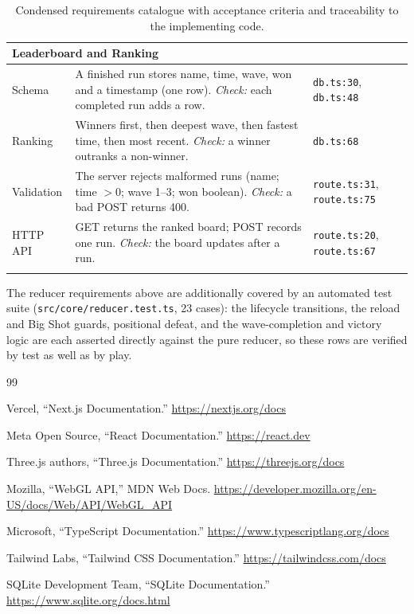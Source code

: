 \documentclass[12pt,a4paper]{report}
\begin{document}
\begin{longtable}{|p{1.5cm}|p{7.9cm}|p{4.2cm}|}
\multicolumn{3}{|l|}{\textbf{Leaderboard and Ranking}} \\ \hline
Schema & A finished run stores name, time, wave, won and a timestamp (one row). \emph{Check:} each completed run adds a row. & \texttt{db.ts:30}, \texttt{db.ts:48} \\ \hline
Ranking & Winners first, then deepest wave, then fastest time, then most recent. \emph{Check:} a winner outranks a non-winner. & \texttt{db.ts:68} \\ \hline
Validation & The server rejects malformed runs (name; time $>0$; wave 1--3; won boolean). \emph{Check:} a bad POST returns 400. & \texttt{route.ts:31}, \texttt{route.ts:75} \\ \hline
HTTP API & GET returns the ranked board; POST records one run. \emph{Check:} the board updates after a run. & \texttt{route.ts:20}, \texttt{route.ts:67} \\ \hline

\caption{Condensed requirements catalogue with acceptance criteria and traceability
to the implementing code.}
\label{tab:appendix-trace}
\end{longtable}
\normalsize
\renewcommand{\arraystretch}{1.0}

The reducer requirements above are additionally covered by an automated test suite
(\texttt{src/core/reducer.test.ts}, 23 cases): the lifecycle transitions, the
reload and Big Shot guards, positional defeat, and the wave-completion and victory
logic are each asserted directly against the pure reducer, so these rows are
verified by test as well as by play.

\renewcommand{\bibname}{References}
{}
\begin{thebibliography}{99}

 Vercel, ``Next.js Documentation.'' \url{https://nextjs.org/docs}

 Meta Open Source, ``React Documentation.'' \url{https://react.dev}

 Three.js authors, ``Three.js Documentation.''
\url{https://threejs.org/docs}

 Mozilla, ``WebGL API,'' MDN Web Docs.
\url{https://developer.mozilla.org/en-US/docs/Web/API/WebGL_API}

 Microsoft, ``TypeScript Documentation.''
\url{https://www.typescriptlang.org/docs}

 Tailwind Labs, ``Tailwind CSS Documentation.''
\url{https://tailwindcss.com/docs}

 SQLite Development Team, ``SQLite Documentation.''
\url{https://www.sqlite.org/docs.html}

\end{thebibliography}
\end{document}
